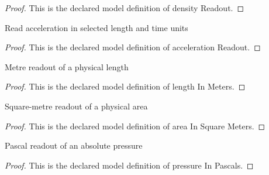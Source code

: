 \begin{proof}
  This is the declared model definition of density Readout.
\end{proof}
\begin{definition}
  \label{def:physics:phyx-mini-0663:phyxminiproblems-problemphyxmini0663-accelerationreadout}
  Read acceleration in selected length and time units
\end{definition}
\begin{proof}
  This is the declared model definition of acceleration Readout.
\end{proof}
\begin{definition}
  \label{def:physics:phyx-mini-0663:phyxminiproblems-problemphyxmini0663-lengthinmeters}
  Metre readout of a physical length
\end{definition}
\begin{proof}
  This is the declared model definition of length In Meters.
\end{proof}
\begin{definition}
  \label{def:physics:phyx-mini-0663:phyxminiproblems-problemphyxmini0663-areainsquaremeters}
  Square-metre readout of a physical area
\end{definition}
\begin{proof}
  This is the declared model definition of area In Square Meters.
\end{proof}
\begin{definition}
  \label{def:physics:phyx-mini-0663:phyxminiproblems-problemphyxmini0663-pressureinpascals}
  Pascal readout of an absolute pressure
\end{definition}
\begin{proof}
  This is the declared model definition of pressure In Pascals.
\end{proof}

